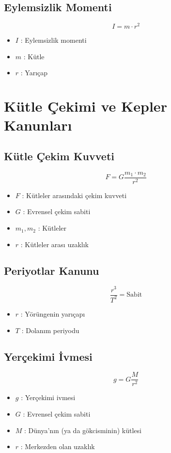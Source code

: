 \documentclass[a4paper, 11pt, titlepage]{article}
\begin{document}
\subsection{Eylemsizlik Momenti}
\[
I = m \cdot r^2
\]
\begin{itemize}
  \item $I$ : Eylemsizlik momenti
  \item $m$ : Kütle
  \item $r$ : Yarıçap
\end{itemize}
\section[Kütle Çekimi ve Kepler Kanunları]{Kütle Çekimi ve Kepler \\Kanunları}
\subsection{Kütle Çekim Kuvveti}
\[
F = G \frac{m_1 \cdot m_2}{r^2}
\]
\begin{itemize}
  \item $F$ : Kütleler arasındaki çekim kuvveti
  \item $G$ : Evrensel çekim sabiti
  \item $m_1, m_2$ : Kütleler
  \item $r$ : Kütleler arası uzaklık
\end{itemize}

\subsection{Periyotlar Kanunu}
\[
\frac{r^3}{T^2} = \mathrm{Sabit}
\]
\begin{itemize}
  \item $r$ : Yörüngenin yarıçapı
  \item $T$ : Dolanım periyodu
\end{itemize}


\subsection{Yerçekimi İvmesi}
\[
g = G \frac{M}{r^2}
\]
\begin{itemize}
  \item $g$ : Yerçekimi ivmesi
  \item $G$ : Evrensel çekim sabiti
  \item $M$ : Dünya'nın (ya da gökcisminin) kütlesi
  \item $r$ : Merkezden olan uzaklık
\end{itemize}
\end{document}

